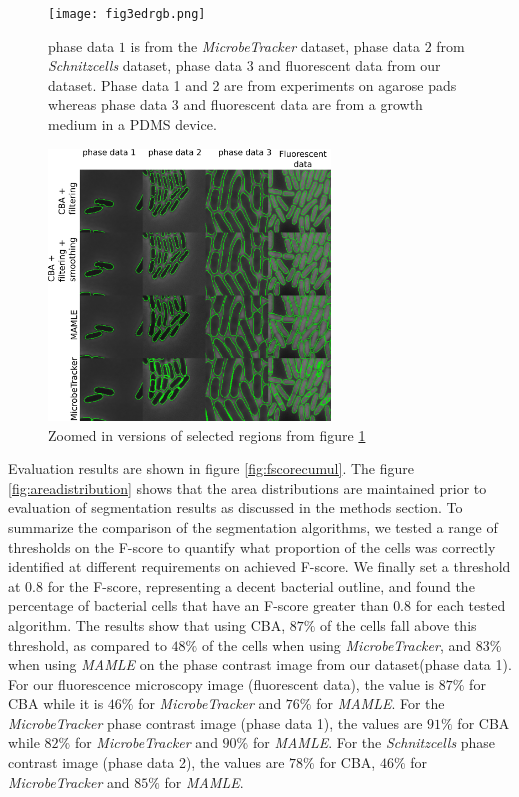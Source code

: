 \documentclass[journal]{IEEEtran}
\begin{document}
\begin{figure}[h]
	\begin{center}
		
		\texttt{[image: fig3edrgb.png]}			
		
		\caption{phase data $1$ is from the \textit{MicrobeTracker} dataset, phase data $2$ from \textit{Schnitzcells} dataset, phase data $3$ and fluorescent data from our dataset. Phase data 1 and 2 are from experiments on agarose pads whereas phase data 3 and fluorescent data are from a growth medium in a PDMS device.}\label{fig:segcompare}
	\end{center}
\end{figure}


\begin{figure}[h]
	\begin{center}
		
		\includegraphics[width=7.5cm]{fig4ed.png}					
		\caption{Zoomed in versions of selected regions from figure \ref{fig:segcompare}}\label{fig:segcomparezoom}
	\end{center}
\end{figure}

Evaluation results are shown in figure \ref{fig:fscorecumul}. The figure \ref{fig:areadistribution} shows that the area distributions are maintained prior to evaluation of segmentation results as discussed in the methods section. To summarize the comparison of the segmentation algorithms, we tested a range of thresholds on the F-score to quantify what proportion of the cells was correctly identified at different requirements on achieved F-score. We finally set a threshold at $0.8$ for the F-score, representing a decent bacterial outline, and found the percentage of bacterial cells that have an F-score greater than $0.8$ for each tested algorithm. The results show that using CBA, $87\%$ of the cells fall above this threshold, as compared to $48\%$ of the cells when using  \textit{MicrobeTracker}, and $83\%$ when using \textit{MAMLE} on the phase contrast image from our dataset(phase data 1). For our fluorescence microscopy image (fluorescent data), the value is $87\%$ for CBA while it is $46\%$ for \textit{MicrobeTracker} and $76\%$ for \textit{MAMLE}. For the \textit{MicrobeTracker} phase contrast image (phase data 1), the values are $91\%$ for CBA while $82\%$ for \textit{MicrobeTracker} and $90\%$ for \textit{MAMLE}. For the \textit{Schnitzcells} phase contrast image (phase data 2), the values are $78\%$ for CBA, $46\%$ for \textit{MicrobeTracker} and $85\%$ for \textit{MAMLE}.
\end{document}
